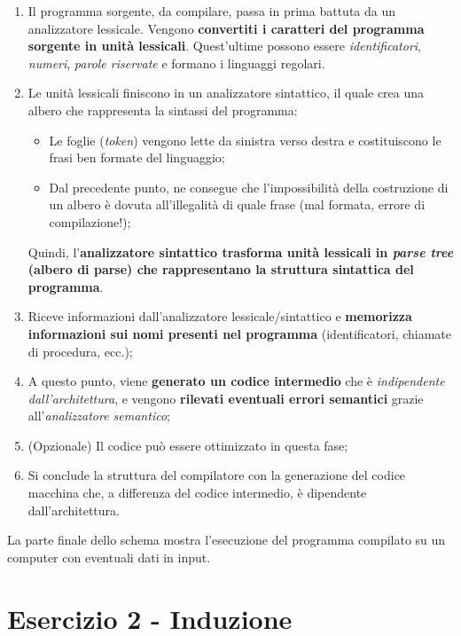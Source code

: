 \documentclass[a4paper]{article}
\begin{document}
	\begin{enumerate}
		\item Il programma sorgente, da compilare, passa in prima battuta da un analizzatore lessicale. Vengono \textbf{convertiti i caratteri del programma sorgente in unità lessicali}. Quest'ultime possono essere \emph{identificatori}, \emph{numeri}, \emph{parole riservate} e formano i linguaggi regolari.
		
		\item Le unità lessicali finiscono in un analizzatore sintattico, il quale crea una albero che rappresenta la sintassi del programma:
		\begin{itemize}
			\item Le foglie (\emph{token}) vengono lette da sinistra verso destra e costituiscono le frasi ben formate del linguaggio;
			
			\item Dal precedente punto, ne consegue che l'impossibilità della costruzione di un albero è dovuta all'illegalità di quale frase (mal formata, errore di compilazione!);
		\end{itemize}
		Quindi, l'\textbf{analizzatore sintattico trasforma unità lessicali in \emph{parse tree} (albero di parse) che rappresentano la struttura sintattica del programma}.
		
		\item Riceve informazioni dall'analizzatore lessicale/sintattico e \textbf{memorizza informazioni sui nomi presenti nel programma} (identificatori, chiamate di procedura, ecc.);
		
		\item A questo punto, viene \textbf{generato un codice intermedio} che è \emph{indipendente dall'architettura}, e vengono \textbf{rilevati eventuali errori semantici} grazie all'\emph{analizzatore semantico};
		
		\item (Opzionale) Il codice può essere ottimizzato in questa fase;
		
		\item Si conclude la struttura del compilatore con la generazione del codice macchina che, a differenza del codice intermedio, è dipendente dall'architettura.
	\end{enumerate}
	La parte finale dello schema mostra l'esecuzione del programma compilato su un computer con eventuali dati in input.
	
	\newpage
	\section{Esercizio 2 - Induzione}
	
\end{document}
